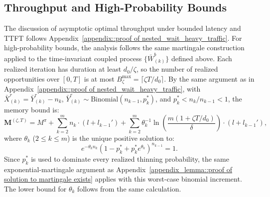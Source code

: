 \subsection{Throughput and High-Probability Bounds}

The discussion of asymptotic optimal throughput under bounded latency and TTFT follows Appendix~\ref{appendix::proof of nested_wait_heavy_traffic}. For high-probability bounds, the analysis follows the same martingale construction applied to the time-invariant coupled process $\{ \bar{W}_{(k)}^b \}$ defined above. Each realized iteration has duration at least \(d_0/\zeta\), so the number of realized opportunities over \([0,T]\) is at most \(B_\zeta^{\max}=\lceil \zeta T/d_0\rceil\). By the same argument as in Appendix~\ref{appendix::proof of nested_wait_heavy_traffic}, with $\bar{X}_{(k)}^{r} = \bar{Y}_{(k)}^r - n_k$, $\bar{Y}_{(k)}^r \sim \text{Binomial}(n_{k-1}, p_k^*)$, and $p_k^*<n_k/n_{k-1}<1$, the memory bound is:
$$\mathbf{M}^{(\zeta,T)} = M^{\pi} + \sum_{k=2}^m n_k \cdot (l + l_{k-1}') + \sum_{k=2}^m \theta_k^{-1}\ln\left( \frac{m(1+\zeta T/d_0)}{\delta} \right) \cdot (l + l_{k-1}'),$$
where $\theta_k$ ($2\leq k\leq m$) is the unique positive solution to:
\begin{equation}
e^{-\theta_k n_k} (1 - p_k^* + p_k^* e^{\theta_k})^{n_{k-1}} = 1.\label{eq::eq of theta, time varying}
\end{equation}
Since \(p_k^*\) is used to dominate every realized thinning probability, the same exponential-martingale argument as Appendix~\ref{appendix_lemma::proof of solution to martingale exists} applies with this worst-case binomial increment. The lower bound for \(\theta_k\) follows from the same calculation.

